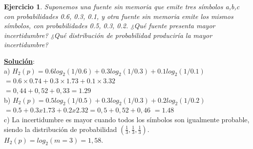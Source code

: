 \documentclass{beamer}
\newtheorem{ejercicio} [Corolario]{Ejercicio}
\begin{document}
\begin{frame}  \small

\begin{ejercicio}
Suponemos una fuente sin memoria que emite tres símbolos a,b,c con probabilidades 0.6, 0.3, 0.1, y otra fuente sin memoria emite los mismos símbolos, con probabilidades 0.5, 0.3, 0.2. ¿Qué fuente presenta mayor incertidumbre? ¿Qué distribución de probabilidad produciría la mayor incertidumbre?
\end{ejercicio}

\pause

\underline{\textbf{Solución}}:\\

a) $H_2(p) = 0.6 log_2(1/0.6) + 0.3 log_2(1/0.3) + 0.1 log_2(1/0.1)$\\
   $ = 0.6 \times 0.74 +  0.3 \times 1.73 + 0.1 \times 3.32$\\
   $ = 0,44 +0,52 + 0,33 =  1.29 $ \\

b) $H_2(p) =  0.5 log_2(1/0.5) + 0.3 log_2(1/0.3) + 0.2 log_2(1/0.2)$\\
	$ = 0.5 +  0.3 x 1.73 + 0.2 x 2.32 = 0,5 +0,52 + 0,46$
	$=  1.48 $\\

c)  La incertidumbre es mayor cuando todos los símbolos son igualmente probable, siendo la distribución de probabilidad $(\frac{1}{3},\frac{1}{3},\frac{1}{3})$. $H_2(p) = log_2(m=3) = 1,58.  $\\

\end{frame} 
\end{document}
